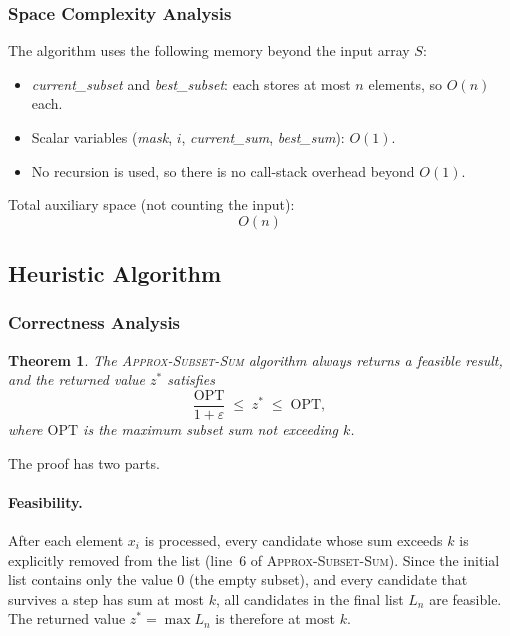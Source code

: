 \documentclass[12pt,a4paper]{article}
\newtheorem{theorem}{Theorem}[section]
\theoremstyle{definition}
\begin{document}
\subsubsection{Space Complexity Analysis}

The algorithm uses the following memory beyond the input array $S$:

\begin{itemize}[noitemsep]
  \item \textit{current\_subset} and \textit{best\_subset}: each stores at
        most $n$ elements, so $O(n)$ each.
  \item Scalar variables (\textit{mask}, $i$, \textit{current\_sum},
        \textit{best\_sum}): $O(1)$.
  \item No recursion is used, so there is no call-stack overhead beyond $O(1)$.
\end{itemize}

Total auxiliary space (not counting the input):
\[
  \boxed{O(n)}
\]

\subsection{Heuristic Algorithm}

\subsubsection{Correctness Analysis}

\begin{theorem}
  The \textsc{Approx-Subset-Sum} algorithm always returns a feasible result,
  and the returned value $z^*$ satisfies
  \[
    \frac{\mathrm{OPT}}{1+\varepsilon} \;\leq\; z^* \;\leq\; \mathrm{OPT},
  \]
  where $\mathrm{OPT}$ is the maximum subset sum not exceeding $k$.
\end{theorem}

The proof has two parts.

\paragraph{Feasibility.}
After each element $x_i$ is processed, every candidate whose sum exceeds $k$ is
explicitly removed from the list (line~6 of \textsc{Approx-Subset-Sum}). Since the
initial list contains only the value $0$ (the empty subset), and every candidate that
survives a step has sum at most $k$, all candidates in the final list $L_n$ are
feasible. The returned value $z^* = \max L_n$ is therefore at most $k$.
\end{document}
